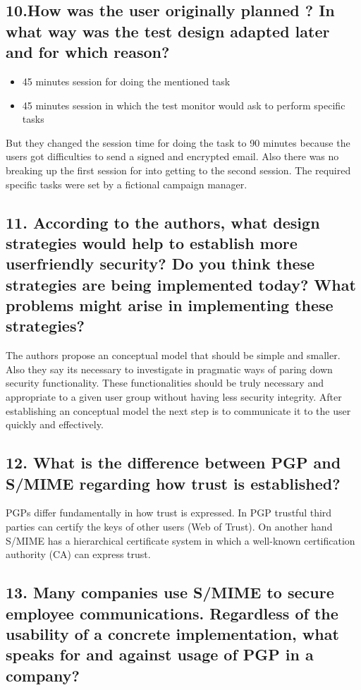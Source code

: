 \subsection{10.How was the user originally planned ? In what way was the test design adapted later and for which reason?}
\begin{itemize}
The actual test plan was separated into two parts. 
	\item 45 minutes session for doing the mentioned task 
	\item 45 minutes session in which the test monitor would ask to perform specific tasks
\end{itemize}
But they changed the session time for doing the task to 90 minutes because the users got difficulties to send a signed and encrypted email. Also there was no breaking up the first session for into getting to the second session. The required specific tasks were set by a fictional campaign manager. 


\subsection{11. According to the authors, what design strategies would help to establish more userfriendly security? Do you think these strategies are being implemented today? What problems might arise in implementing these strategies?}

The authors propose an conceptual model  that should be simple and smaller. Also they say its necessary to investigate in pragmatic ways of paring down security functionality. These functionalities should be truly necessary and appropriate to a given user group without having less security integrity. After establishing an conceptual model the next step is to communicate it to the user quickly and effectively. 

\subsection{12. What is the difference between PGP and S/MIME regarding how trust is established? }

PGPs differ fundamentally in how trust is expressed. In PGP trustful third parties can certify the keys of other users (Web of Trust). On another hand S/MIME has a hierarchical certificate system in which a well-known certification authority (CA) can express trust. 

\subsection{13. Many companies use S/MIME to secure employee communications. Regardless of the usability of a concrete implementation, what speaks for and against usage of PGP in a company?}

